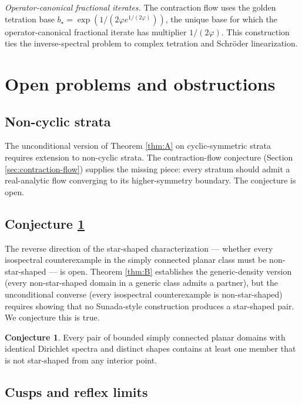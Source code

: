 \documentclass[11pt,reqno]{amsart}
\theoremstyle{plain}
\theoremstyle{definition}
\newtheorem*{conjecture}{Conjecture}
\theoremstyle{remark}
\newcommand{\bstar}{b_{\star}}
\begin{document}
\emph{Operator-canonical fractional iterates.} The contraction flow uses the golden tetration base $\bstar = \exp(1/(2\varphi e^{1/(2\varphi)}))$, the unique base for which the operator-canonical fractional iterate has multiplier $1/(2\varphi)$. This construction \cite{GulatiTetration} ties the inverse-spectral problem to complex tetration and Schröder linearization.

\section{Open problems and obstructions}\label{sec:open}

\subsection{Non-cyclic strata}\label{ss:non-cyclic-open}

The unconditional version of Theorem \ref{thm:A} on cyclic-symmetric strata requires extension to non-cyclic strata. The contraction-flow conjecture (Section \ref{sec:contraction-flow}) supplies the missing piece: every stratum should admit a real-analytic flow converging to its higher-symmetry boundary. The conjecture is open.

\subsection{Conjecture \ref{conj:converse}}\label{ss:conv-open}

The reverse direction of the star-shaped characterization — whether every isospectral counterexample in the simply connected planar class must be non-star-shaped — is open. Theorem \ref{thm:B} establishes the generic-density version (every non-star-shaped domain in a generic class admits a partner), but the unconditional converse (every isospectral counterexample is non-star-shaped) requires showing that no Sunada-style construction produces a star-shaped pair. We conjecture this is true.

\begin{conjecture}\label{conj:converse}
Every pair of bounded simply connected planar domains with identical Dirichlet spectra and distinct shapes contains at least one member that is not star-shaped from any interior point.
\end{conjecture}

\subsection{Cusps and reflex limits}\label{ss:cusps-open}
\end{document}
